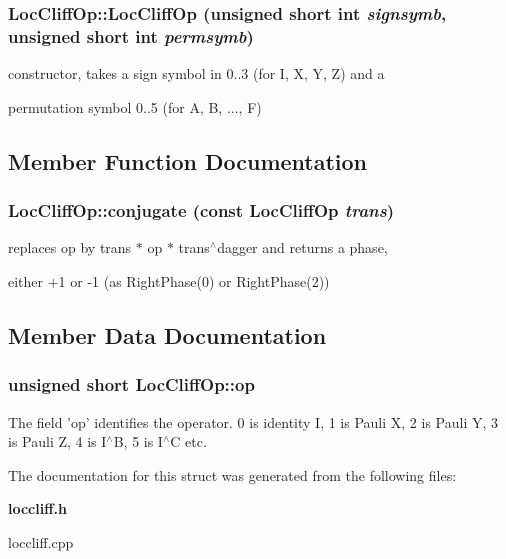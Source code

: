 \subsubsection{\setlength{\rightskip}{0pt plus 5cm}Loc\-Cliff\-Op::Loc\-Cliff\-Op (unsigned short int {\em signsymb}, unsigned short int {\em permsymb})\hspace{0.3cm}{\tt  [inline]}}\label{structLocCliffOp_a1}


constructor, takes a sign symbol in 0..3 (for I, X, Y, Z) and a 

permutation symbol 0..5 (for A, B, ..., F) 

\subsection{Member Function Documentation}
\subsubsection{ Loc\-Cliff\-Op::conjugate (const {\bf Loc\-Cliff\-Op} {\em trans})}\label{structLocCliffOp_a3}


replaces op by trans $\ast$ op $\ast$ trans$^\wedge$dagger and returns a phase, 

either +1 or -1 (as Right\-Phase(0) or Right\-Phase(2)) 

\subsection{Member Data Documentation}
\subsubsection{\setlength{\rightskip}{0pt plus 5cm}unsigned short {\bf Loc\-Cliff\-Op::op}}\label{structLocCliffOp_o0}


The field 'op' identifies the operator. 0 is identity I, 1 is Pauli X, 2 is Pauli Y, 3 is Pauli Z, 4 is I$^\wedge$B, 5 is I$^\wedge$C etc. 

The documentation for this struct was generated from the following files:\begin{CompactItemize}
\item 
{\bf loccliff.h}\item 
loccliff.cpp\end{CompactItemize}
